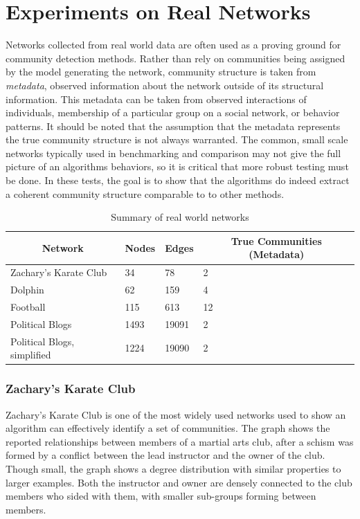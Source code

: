\chapter{Experiments on Real Networks}

Networks collected from real world data are often used as a proving ground for community detection methods. Rather than rely on communities being assigned by the model generating the network, community structure is taken from \textit{metadata}, observed information about the network outside of its structural information. This metadata can be taken from observed interactions of individuals, membership of a particular group on a social network, or behavior patterns.  It should be noted that the assumption that the metadata represents the true community structure is not always warranted. The common, small scale networks typically used in benchmarking and comparison may not give the full picture of an algorithms behaviors, so it is critical that more robust testing must be done. In these tests, the goal is to show that the algorithms do indeed extract a coherent community structure comparable to to other methods.


\begin{table}[h!]
	\centering
	\begin{tabular}{ |l | l| l | l | } 
		\hline
		\multicolumn{1}{|c|}{\textbf{Network}} & \multicolumn{1}{|c|}{\textbf{Nodes}} &
		\multicolumn{1}{|c|}{\textbf{Edges}} & \multicolumn{1}{|c|}{\textbf{True Communities (Metadata)}} \\
		\hline
		\hline
		Zachary's Karate Club & 34  & 78 & 2\\ 
		\hline
		Dolphin & 62  & 159 & 4\\ 
		\hline
		Football & 115  & 613 & 12\\ 
		\hline	
		Political Blogs & 1493  & 19091 & 2\\ 
		\hline
		Political Blogs, simplified & 1224  & 19090 & 2\\ 
		\hline
	\end{tabular}
	\caption{Summary of real world networks}
	\label{table:real}
\end{table}


\subsection{Zachary's Karate Club}
Zachary's Karate Club \cite{Zachary1977} is one of the most widely used networks used to show an algorithm can effectively identify a set of communities. The graph shows the reported relationships between members of a martial arts club, after a schism was formed by a conflict between the lead instructor and the owner of the club. Though small, the graph shows a degree distribution with similar properties to larger examples. Both the instructor and owner are densely connected to the club members who sided with them, with smaller sub-groups forming between members. 


